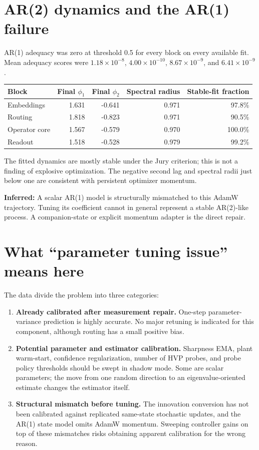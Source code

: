 \documentclass[10pt,letterpaper]{article}
\newcommand{\infv}{\textbf{Inferred:} }
\begin{document}
\section{AR(2) dynamics and the AR(1) failure}

AR(1) adequacy was zero at threshold 0.5 for every block on every available
fit.  Mean adequacy scores were $1.18\times10^{-8}$,
$4.00\times10^{-10}$, $8.67\times10^{-9}$, and $6.41\times10^{-9}$.

\begin{center}
\small
\begin{tabular}{lrrrr}
\toprule
Block & Final $\phi_1$ & Final $\phi_2$ & Spectral radius & Stable-fit fraction \\
\midrule
Embeddings & 1.631 & -0.641 & 0.971 & 97.8\% \\
Routing & 1.818 & -0.823 & 0.971 & 90.5\% \\
Operator core & 1.567 & -0.579 & 0.970 & 100.0\% \\
Readout & 1.518 & -0.528 & 0.979 & 99.2\% \\
\bottomrule
\end{tabular}
\end{center}

The fitted dynamics are mostly stable under the Jury criterion; this is not a
finding of explosive optimization.  The negative second lag and spectral
radii just below one are consistent with persistent optimizer momentum.

\infv A scalar AR(1) model is structurally mismatched to this AdamW trajectory.
Tuning its coefficient cannot in general represent a stable AR(2)-like process.
A companion-state or explicit momentum adapter is the direct repair.

\section{What ``parameter tuning issue'' means here}

The data divide the problem into three categories:

\begin{enumerate}
\item \textbf{Already calibrated after measurement repair.}  One-step
parameter-variance prediction is highly accurate.  No major retuning is
indicated for this component, although routing has a small positive bias.

\item \textbf{Potential parameter and estimator calibration.}  Sharpness EMA,
plant warm-start, confidence regularization, number of HVP probes, and probe
policy thresholds should be swept in shadow mode.  Some are scalar parameters;
the move from one random direction to an eigenvalue-oriented estimate changes
the estimator itself.

\item \textbf{Structural mismatch before tuning.}  The innovation conversion
has not been calibrated against replicated same-state stochastic updates, and
the AR(1) state model omits AdamW momentum.  Sweeping controller gains on top
of these mismatches risks obtaining apparent calibration for the wrong reason.
\end{enumerate}
\end{document}
